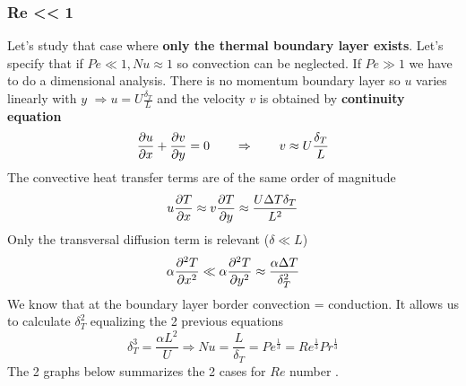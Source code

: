 	\subsubsection{Re << 1}
		Let's study that case where \textbf{only the thermal boundary layer exists}. Let's specify that if $Pe \ll 1, Nu \approx 1$ so convection can be neglected. If $Pe \gg 1$ we have to do a dimensional analysis. There is no momentum boundary layer so $u$ varies linearly with $y$ $\Rightarrow u = U\frac{\delta _T}{L}$ and the velocity $v$ is obtained by \textbf{continuity equation}
		\begin{equation}
			\frac{\D u}{\D x} + \frac{\D v}{\D y} = 0 \qquad \Rightarrow \qquad v \approx U\frac{\delta _T}{L}
		\end{equation}
		The convective heat transfer terms are of the same order of magnitude 
		\begin{equation}
			u\frac{\D T}{\D x} \approx v\frac{\D T}{\D y} \approx \frac{U\Delta T \delta _T}{L^2}
		\end{equation}
		Only the transversal diffusion term is relevant ($\delta \ll L$)
		\begin{equation}
			\alpha \frac{\D ^2 T}{\D x^2} \ll \alpha \frac{\D ^2 T}{\D y^2} \approx \frac{\alpha \Delta T}{\delta _T ^2}
		\end{equation}
		We know that at the boundary layer border convection = conduction. It allows us to calculate $\delta _T^2$ equalizing the 2 previous equations
		\begin{equation}
			\delta _T^3 =  \frac{\alpha L^2}{U} \Rightarrow Nu = \frac{L}{\delta _T} = Pe^{\frac{1}{3}} = Re^{\frac{1}{3}} Pr^{\frac{1}{3}}
		\end{equation}
		The 2 graphs below summarizes the 2 cases for $Re$ number	.	\\
		
